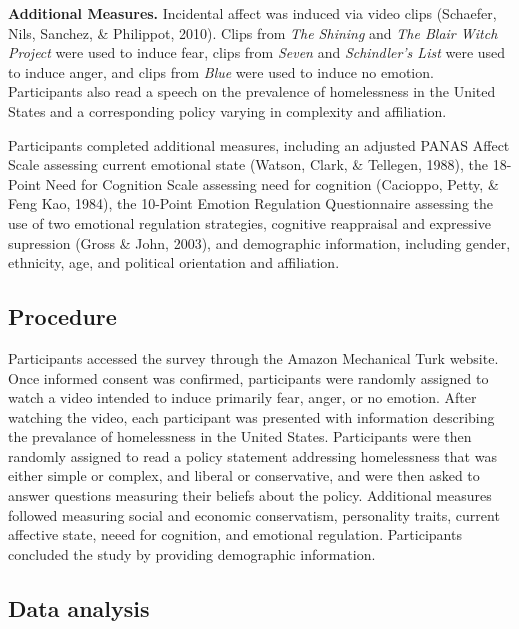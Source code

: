 \documentclass[man]{apa6}
\begin{document}
\textbf{Additional Measures.} Incidental affect was induced via video
clips (Schaefer, Nils, Sanchez, \& Philippot, 2010). Clips from
\emph{The Shining} and \emph{The Blair Witch Project} were used to
induce fear, clips from \emph{Seven} and \emph{Schindler's List} were
used to induce anger, and clips from \emph{Blue} were used to induce no
emotion. Participants also read a speech on the prevalence of
homelessness in the United States and a corresponding policy varying in
complexity and affiliation.

Participants completed additional measures, including an adjusted PANAS
Affect Scale assessing current emotional state (Watson, Clark, \&
Tellegen, 1988), the 18-Point Need for Cognition Scale assessing need
for cognition (Cacioppo, Petty, \& Feng Kao, 1984), the 10-Point Emotion
Regulation Questionnaire assessing the use of two emotional regulation
strategies, cognitive reappraisal and expressive supression (Gross \&
John, 2003), and demographic information, including gender, ethnicity,
age, and political orientation and affiliation.

\subsection{Procedure}\label{procedure}

Participants accessed the survey through the Amazon Mechanical Turk
website. Once informed consent was confirmed, participants were randomly
assigned to watch a video intended to induce primarily fear, anger, or
no emotion. After watching the video, each participant was presented
with information describing the prevalance of homelessness in the United
States. Participants were then randomly assigned to read a policy
statement addressing homelessness that was either simple or complex, and
liberal or conservative, and were then asked to answer questions
measuring their beliefs about the policy. Additional measures followed
measuring social and economic conservatism, personality traits, current
affective state, neeed for cognition, and emotional regulation.
Participants concluded the study by providing demographic information.

\subsection{Data analysis}\label{data-analysis}
\end{document}

